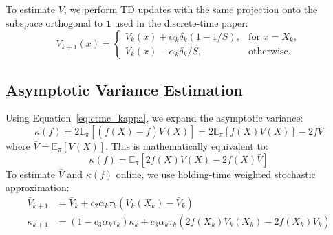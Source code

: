 \documentclass[11pt]{article}
\begin{document}
To estimate $V$, we perform TD updates with the same projection onto the subspace orthogonal to $\mathbf{1}$ used in the discrete-time paper:
\begin{equation}
    V_{k+1}(x) = \begin{cases}
        V_k(x) + \alpha_k \delta_k (1 - 1/S), & \text{for } x = X_k, \\
        V_k(x) - \alpha_k \delta_k / S, & \text{otherwise.}
    \end{cases}
\end{equation}

\subsection{Asymptotic Variance Estimation}
Using Equation~\eqref{eq:ctmc_kappa}, we expand the asymptotic variance:
\begin{equation}
    \kappa(f) = 2\mathbb{E}_\pi [ (f(X) - \bar{f}) V(X) ] = 2\mathbb{E}_\pi [ f(X) V(X) ] - 2\bar{f}\bar{V}
\end{equation}
where $\bar{V} = \mathbb{E}_\pi [V(X)]$. This is mathematically equivalent to:
\begin{equation}
    \kappa(f) = \mathbb{E}_\pi [ 2f(X)V(X) - 2f(X)\bar{V} ]
\end{equation}
To estimate $\bar{V}$ and $\kappa(f)$ online, we use holding-time weighted stochastic approximation:
\begin{align}
    \bar{V}_{k+1} &= \bar{V}_k + c_2 \alpha_k \tau_k (V_k(X_k) - \bar{V}_k) \\
    \kappa_{k+1} &= (1 - c_3 \alpha_k \tau_k) \kappa_k + c_3 \alpha_k \tau_k \left( 2f(X_k)V_k(X_k) - 2f(X_k)\bar{V}_k \right)
\end{align}
\end{document}
